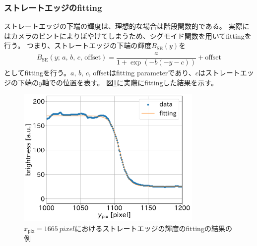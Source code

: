 \documentclass[../../main.tex]{subfiles}
\begin{document}
\subsubsection{ストレートエッジのfitting}
ストレートエッジの下端の輝度は、理想的な場合は階段関数的である。
実際にはカメラのピントによりぼやけてしまうため、シグモイド関数を用いてfittingを行う。
つまり、ストレートエッジの下端の輝度$B_{\mathrm{SE}}(y)$を
\begin{align}
    B_{\mathrm{SE}}(y;\,a,\,b,\,c,\,\text{offset}) = \dfrac{a}{1+\exp(-b(-y-c))} + \mathrm{offset}
\end{align}
としてfittingを行う。$a,\,b,\,c,\,\text{offset}$はfitting parameterであり、$c$はストレートエッジの下端の$y$軸での位置を表す。
図\ref{fig:wiresag_edge_fit}に実際にfittingした結果を示す。
\begin{figure}[H]
    \centering
    \includegraphics[width=0.8\textwidth]{wiresag/wiresag_straight_edge_fit.pdf}
    \caption{$x_{\mathrm{pix}}=\SI{1665}{pixel}$におけるストレートエッジの輝度のfittingの結果の例}
    \label{fig:wiresag_edge_fit}
\end{figure}
\end{document}
